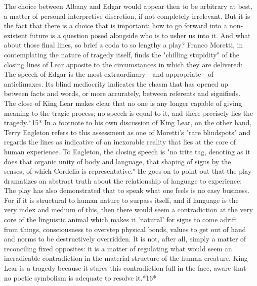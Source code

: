 	The choice between Albany and Edgar would appear then to be arbitrary at best, a matter of personal interpretive discretion, if not completely irrelevant. But it is the fact that there is a choice that is important: how to go forward into a non-existent future is a question posed alongside who is to usher us into it. And what about those final lines, so brief a coda to so lengthy a play? Franco Moretti, in contemplating the nature of tragedy itself, finds the "chilling stupidity" of the closing lines of Lear apposite to the circumstances in which they are delivered:
The speech of Edgar is the most extraordinary—and appropriate—of anticlimaxes. Its blind mediocrity indicates the chasm that has opened up between facts and words, or more accurately, between referents and signifieds. The close of King Lear makes clear that no one is any longer capable of giving meaning to the tragic process; no speech is equal to it, and there precisely lies the tragedy.*15*
In a footnote to his own discussion of King Lear, on the other hand, Terry Eagleton refers to this assessment as one of Moretti's "rare blindspots" and regards the lines as indicative of an inexorable reality that lies at the core of human experience. To Eagleton, the closing speech is "no trite tag, denoting as it does that organic unity of body and language, that shaping of signs by the senses, of which Cordelia is representative." He goes on to point out that the play dramatizes an abstract truth about the relationship of language to experience:
The play has also demonstrated that to speak what one feels is no easy business. For if it is structural to human nature to surpass itself, and if language is the very index and medium of this, then there would seem a contradiction at the very core of the linguistic animal which makes it 'natural' for signs to come adrift from things, consciousness to overstep physical bonds, values to get out of hand and norms to be destructively overridden. It is not, after all, simply a matter of reconciling fixed opposites: it is a matter of regulating what would seem an ineradicable contradiction in the material structure of the human creature. King Lear is a tragedy because it stares this contradiction full in the face, aware that no poetic symbolism is adequate to resolve it.*16*
